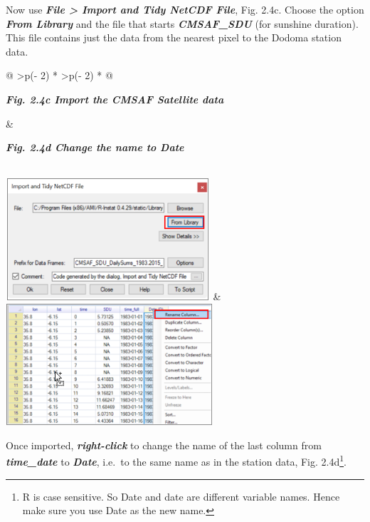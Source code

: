 \documentclass[
  letterpaper,
  DIV=11,
  numbers=noendperiod]{scrreprt}
\begin{document}
Now use \textbf{\emph{File \textgreater{} Import and Tidy NetCDF File}},
Fig. 2.4c. Choose the option \textbf{\emph{From Library}} and the file
that starts \textbf{\emph{CMSAF\_SDU}} (for sunshine duration). This
file contains just the data from the nearest pixel to the Dodoma station
data.

\begin{longtable}[]{@{}
  >{\centering\arraybackslash}p{(\columnwidth - 2\tabcolsep) * }
  >{\centering\arraybackslash}p{(\columnwidth - 2\tabcolsep) * }@{}}
\toprule\noalign{}
\begin{minipage}[b]{\linewidth}\centering
\textbf{\emph{Fig. 2.4c Import the CMSAF Satellite data}}
\end{minipage} & \begin{minipage}[b]{\linewidth}\centering
\textbf{\emph{Fig. 2.4d Change the name to Date}}
\end{minipage} \\
\midrule\noalign{}
\endhead
\bottomrule\noalign{}
\endlastfoot
\includegraphics[width=2.988in,height=1.781in]{figures/Fig2.4c.png} &
\includegraphics[width=3.04in,height=1.774in]{figures/Fig2.4d.png} \\
\end{longtable}

Once imported, \textbf{\emph{right-click}} to change the name of the
last column from \textbf{\emph{time\_date}} to \textbf{\emph{Date}},
i.e.~to the same name as in the station data, Fig. 2.4d\footnote{R is
  case sensitive. So Date and date are different variable names. Hence
  make sure you use Date as the new name.}.
\end{document}
